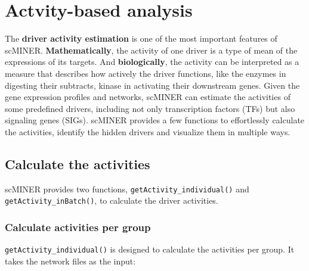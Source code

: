 \documentclass[
  12pt,
]{book}
\newenvironment{Shaded}{\begin{snugshade}}{\end{snugshade}}
\newcommand{\AttributeTok}[1]{\textcolor[rgb]{0.13,0.29,0.53}{#1}}
\newcommand{\DocumentationTok}[1]{\textcolor[rgb]{0.56,0.35,0.01}{\textbf{\textit{#1}}}}
\newcommand{\FunctionTok}[1]{\textcolor[rgb]{0.13,0.29,0.53}{\textbf{#1}}}
\newcommand{\NormalTok}[1]{#1}
\newcommand{\OtherTok}[1]{\textcolor[rgb]{0.56,0.35,0.01}{#1}}
\newcommand{\SpecialCharTok}[1]{\textcolor[rgb]{0.81,0.36,0.00}{\textbf{#1}}}
\newcommand{\StringTok}[1]{\textcolor[rgb]{0.31,0.60,0.02}{#1}}
\begin{document}
\chapter{Actvity-based analysis}\label{actvity-based-analysis}

The \textbf{driver activity estimation} is one of the most important features of scMINER. \textbf{Mathematically}, the activity of one driver is a type of mean of the expressions of its targets. And \textbf{biologically}, the activity can be interpreted as a measure that describes how actively the driver functions, like the enzymes in digesting their subtracts, kinase in activating their downstream genes. Given the gene expression profiles and networks, scMINER can estimate the activities of some predefined drivers, including not only transcription factors (TFs) but also signaling genes (SIGs). scMINER provides a few functions to effortlessly calculate the activities, identify the hidden drivers and visualize them in multiple ways.

\section{Calculate the activities}\label{calculate-the-activities}

scMINER provides two functions, \texttt{getActivity\_individual()} and \texttt{getActivity\_inBatch()}, to calculate the driver activities.

\subsection{Calculate activities per group}\label{calculate-activities-per-group}

\texttt{getActivity\_individual()} is designed to calculate the activities per group. It takes the network files as the input:

\begin{Shaded}
\end{Shaded}
\end{document}
